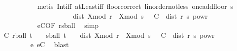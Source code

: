 \begin{isabellebody}
\ \ \ \ \ \ \ \ \ \ \isamarkupfalse%
\ {\isacharparenleft}{\kern0pt}metis\ Int{\isacharunderscore}{\kern0pt}iff\ atLeast{\isacharunderscore}{\kern0pt}iff\ floor{\isacharunderscore}{\kern0pt}correct\ linorder{\isacharunderscore}{\kern0pt}not{\isacharunderscore}{\kern0pt}less\ one{\isacharunderscore}{\kern0pt}add{\isacharunderscore}{\kern0pt}floor\ s{\isacharparenright}{\kern0pt}\isanewline
\ \ \ \ \ \ \ \ \ \ \isamarkupfalse%
\isanewline
\ \ \ \ \ \ \ \ \isamarkupfalse%
\ \isamarkupfalse%
\ {\isachardoublequoteopen}dist\ {\isacharparenleft}{\kern0pt}X{\isacharunderscore}{\kern0pt}mod\ r\ {\isasymomega}{\isacharparenright}{\kern0pt}\ {\isacharparenleft}{\kern0pt}X{\isacharunderscore}{\kern0pt}mod\ s\ {\isasymomega}{\isacharparenright}{\kern0pt}\ {\isasymle}\ C\ {\isacharasterisk}{\kern0pt}\ dist\ r\ s\ powr\ {\isasymgamma}{\isachardoublequoteclose}\isanewline
\ \ \ \ \ \ \ \ \ \ \isamarkupfalse%
\ eC{\isacharparenleft}{\kern0pt}{}{\isacharparenright}{\kern0pt}{\isacharbrackleft}{\kern0pt}OF\ rs{\isacharunderscore}{\kern0pt}ball{\isacharbrackright}{\kern0pt}\ \isamarkupfalse%
\ simp\isanewline
\ \ \ \ \ \ \isacommand{{\isacharbraceright}{\kern0pt}}\isamarkupfalse%
\isanewline
\ \ \ \ \ \ \isamarkupfalse%
\ \isamarkupfalse%
\ {\isachardoublequoteopen}{\isasymexists}{\isasymepsilon}{\isachargreater}{\kern0pt}{}{\isachardot}{\kern0pt}\ {\isasymexists}C{\isasymge}{}{\isachardot}{\kern0pt}\ {\isasymforall}r{\isasymin}ball\ t\ {\isasymepsilon}\ {\isasyminter}\ {\isacharbraceleft}{\kern0pt}{}{\isachardot}{\kern0pt}{\isachardot}{\kern0pt}{\isacharbraceright}{\kern0pt}{\isachardot}{\kern0pt}\ {\isasymforall}s{\isasymin}ball\ t\ {\isasymepsilon}\ {\isasyminter}\ {\isacharbraceleft}{\kern0pt}{}{\isachardot}{\kern0pt}{\isachardot}{\kern0pt}{\isacharbraceright}{\kern0pt}{\isachardot}{\kern0pt}\ dist\ {\isacharparenleft}{\kern0pt}X{\isacharunderscore}{\kern0pt}mod\ r\ {\isasymomega}{\isacharparenright}{\kern0pt}\ {\isacharparenleft}{\kern0pt}X{\isacharunderscore}{\kern0pt}mod\ s\ {\isasymomega}{\isacharparenright}{\kern0pt}\ {\isasymle}\ C\ {\isacharasterisk}{\kern0pt}\ dist\ r\ s\ powr\ {\isasymgamma}{\isachardoublequoteclose}\isanewline
\ \ \ \ \ \ \ \ \isamarkupfalse%
\ e{\isacharprime}{\kern0pt}\ eC{\isacharparenleft}{\kern0pt}{}{\isacharparenright}{\kern0pt}\ \isamarkupfalse%
\ blast\isanewline
\ \ \ \ \isamarkupfalse%

\end{isabellebody}
